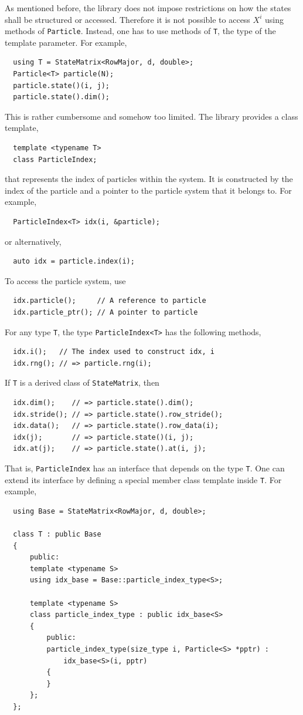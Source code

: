 As mentioned before, the library does not impose restrictions on how the states
shall be structured or accessed. Therefore it is not possible to access $X^i$
using methods of \verb|Particle|. Instead, one has to use methods of \verb|T|,
the type of the template parameter. For example,
\begin{Verbatim}
  using T = StateMatrix<RowMajor, d, double>;
  Particle<T> particle(N);
  particle.state()(i, j);
  particle.state().dim();
\end{Verbatim}
This is rather cumbersome and somehow too limited. The library provides a class
template,
\begin{Verbatim}
  template <typename T>
  class ParticleIndex;
\end{Verbatim}
that represents the index of particles within the system. It is constructed by
the index of the particle and a pointer to the particle system that it belongs
to. For example,
\begin{Verbatim}
  ParticleIndex<T> idx(i, &particle);
\end{Verbatim}
or alternatively,
\begin{Verbatim}
  auto idx = particle.index(i);
\end{Verbatim}
To access the particle system, use
\begin{Verbatim}
  idx.particle();     // A reference to particle
  idx.particle_ptr(); // A pointer to particle
\end{Verbatim}
For any type \verb|T|, the type \verb|ParticleIndex<T>| has the following
methods,
\begin{Verbatim}
  idx.i();   // The index used to construct idx, i
  idx.rng(); // => particle.rng(i);
\end{Verbatim}
If \verb|T| is a derived class of \verb|StateMatrix|, then
\begin{Verbatim}
  idx.dim();    // => particle.state().dim();
  idx.stride(); // => particle.state().row_stride();
  idx.data();   // => particle.state().row_data(i);
  idx(j);       // => particle.state()(i, j);
  idx.at(j);    // => particle.state().at(i, j);
\end{Verbatim}
That is, \verb|ParticleIndex| has an interface that depends on the type
\verb|T|. One can extend its interface by defining a special member class
template inside \verb|T|. For example,
\begin{Verbatim}
  using Base = StateMatrix<RowMajor, d, double>;

  class T : public Base
  {
      public:
      template <typename S>
      using idx_base = Base::particle_index_type<S>;

      template <typename S>
      class particle_index_type : public idx_base<S>
      {
          public:
          particle_index_type(size_type i, Particle<S> *pptr) :
              idx_base<S>(i, pptr)
          {
          }
      };
  };
\end{Verbatim}
